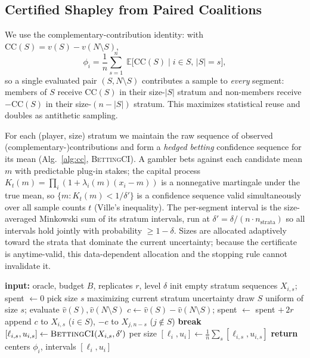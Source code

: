 \documentclass[10pt,twocolumn,letterpaper]{article}
\theoremstyle{plain}
\theoremstyle{definition}
\newcommand{\N}{N}
\newcommand{\shap}{\phi}
\newcommand{\cc}{\mathrm{CC}}
\newcommand{\E}{\mathbb{E}}
\newcommand{\vhat}{\hat{v}}
\begin{document}
\subsection{Certified Shapley from Paired Coalitions}

We use the complementary-contribution identity: with
$\cc(S)=v(S)-v(\N\setminus S)$,
\begin{equation}
\shap_i=\frac1n\sum_{s=1}^{n}\;\E\big[\cc(S)\;\big|\;i\in S,\,|S|=s\big],
\label{eq:cc}
\end{equation}
so a single evaluated pair $(S,\N\setminus S)$ contributes a sample to
\emph{every} segment: members of $S$ receive $\cc(S)$ in their size-$|S|$
stratum and non-members receive $-\cc(S)$ in their size-$(n{-}|S|)$ stratum. This
maximizes statistical reuse and doubles as antithetic sampling.

For each (player, size) stratum we maintain the raw sequence of observed
(complementary-)contributions and form a \emph{hedged betting} confidence
sequence for its mean (Alg.~\ref{alg:cc}, \textsc{BettingCI}). A gambler bets
against each candidate mean $m$ with predictable plug-in stakes; the capital
process $K_t(m)=\prod_i(1+\lambda_i(m)(x_i-m))$ is a nonnegative martingale under
the true mean, so $\{m:K_t(m)<1/\delta'\}$ is a confidence sequence valid
simultaneously over all sample counts $t$ (Ville's inequality). The per-segment
interval is the size-averaged Minkowski sum of its stratum intervals, run at
$\delta'=\delta/(n\cdot n_{\text{strata}})$ so all intervals hold jointly with
probability $\ge 1-\delta$. Sizes are allocated adaptively toward the strata that
dominate the current uncertainty; because the certificate is anytime-valid, this
data-dependent allocation and the stopping rule cannot invalidate it.

\begin{algorithm}[t]
\caption{Certified segment Shapley (\textsc{CC-Bet})}
\label{alg:cc}
\begin{algorithmic}[1]
\State \textbf{input:} oracle, budget $B$, replicates $r$, level $\delta$
\State init empty stratum sequences $X_{i,s}$; spent $\gets 0$
  \State pick size $s$ maximizing current stratum uncertainty
  \State draw $S$ uniform of size $s$; evaluate $\vhat(S),\vhat(\N\setminus S)$
  \State $c\gets\vhat(S)-\vhat(\N\setminus S)$; spent $\gets$ spent $+\,2r$
  \State append $c$ to $X_{i,s}$ ($i\in S$), $-c$ to $X_{j,n-s}$ ($j\notin S$)
   \textbf{break} \EndIf
\EndWhile
{}
  \State $[\ell_{i,s},u_{i,s}]\gets\textsc{BettingCI}(X_{i,s},\delta')$ per size
  \State $[\ell_i,u_i]\gets\frac1n\sum_s[\ell_{i,s},u_{i,s}]$
\EndFor
\State \textbf{return} centers $\shap_i$, intervals $[\ell_i,u_i]$
\end{algorithmic}
\end{algorithm}
\end{document}
